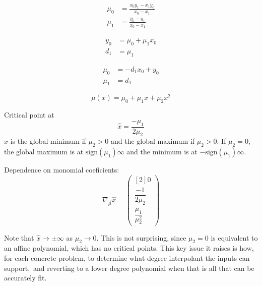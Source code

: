  
\begin{align}
  \mu_0 & = \frac
{x_0 y_1 - x_1 y_0}
{x_0 - x_1} \\
   \mu_1 & = \frac
{y_0 - y_1}
{x_0 - x_1} 
\end{align}


\begin{align}
  y_0 & = \mu_0+\mu_1 x_0  \\
   d_1 & = \mu_1  
\end{align}

 
\begin{align}
  \mu_0 & =  - d_1 x_0+y_0  \\
   \mu_1 & = d_1  
\end{align}


\begin{equation}
\mu(x) = \mu_0 + \mu_1 x + \mu_2 x^2
\end{equation}

Critical point at
\begin{equation}
\hat{x} = \frac{- \mu_1}{2 \mu_2}
\end{equation}
$\hat{x}$ is the global minimum if $\mu_2>0$ 
and the global maximum if $\mu_2>0$.
If $\mu_2 = 0$, the global maximum is at 
$\text{sign}(\mu_1)\infty$
and the minimum is at $-\text{sign}(\mu_1)\infty$.

Dependence on monomial coeficients:
\begin{equation}
\nabla_{\vec{\mu}} \hat{x} =
\begin{pmatrix}[2]
0 
\\
\dfrac{-1}{2 \mu_2} 
\\
\dfrac{\mu_1}{\mu_2^2}
\end{pmatrix}
\end{equation}

Note that $\hat{x} \to  \pm \infty$ as $\mu_2 \to 0$. 
This is not surprising, since $\mu_2 = 0$ is equivalent to
an affine polynomial, which has no critical points.
This key issue it raises is how, for each concrete problem,
to determine what degree interpolant the inputs can support,\
and reverting to a lower degree polynomial when that is all that
can be accurately fit.

